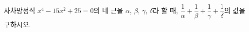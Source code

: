 사차방정식 $x^4-15x^2+25=0$의 네 근을 $\alpha$, $\beta$, $\gamma$, $\delta$라 할 때, $\dfrac{1}{\alpha}+\dfrac{1}{\beta}+\dfrac{1}{\gamma}+\dfrac{1}{\delta}$의 값을 구하시오.
